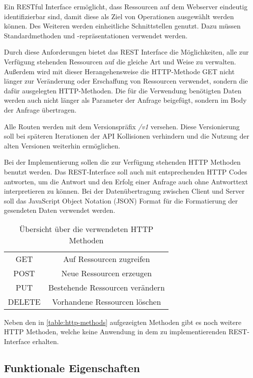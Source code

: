 Ein RESTful Interface ermöglicht, dass Ressourcen auf dem Webserver eindeutig identifizierbar sind, damit diese als Ziel von Operationen ausgewählt werden können. Des Weiteren werden einheitliche Schnittstellen genutzt. Dazu müssen Standardmethoden und -repräsentationen verwendet werden.

Durch diese Anforderungen bietet das REST Interface die Möglichkeiten, alle zur Verfügung stehenden Ressourcen auf die gleiche Art und Weise zu verwalten. Außerdem wird mit dieser Herangehensweise die HTTP-Methode GET nicht länger zur Veränderung oder Erschaffung von Ressourcen verwendet, sondern die dafür ausgelegten HTTP-Methoden. Die für die Verwendung benötigten Daten werden auch nicht länger als Parameter der Anfrage beigefügt, sondern im Body der Anfrage übertragen. \cite{beimsWebApplikationenREST2014}

Alle Routen werden mit dem Versionspräfix \textit{/v1} versehen. Diese Versionierung soll bei späteren Iterationen der API Kollisionen verhindern und die Nutzung der alten Versionen weiterhin ermöglichen. 

Bei der Implementierung sollen die zur Verfügung stehenden HTTP Methoden benutzt werden. Das REST-Interface soll auch mit entsprechenden HTTP Codes antworten, um die Antwort und den Erfolg einer Anfrage auch ohne Antworttext interpretieren zu können. Bei der Datenübertragung zwischen Client und Server soll das JavaScript Object Notation (JSON) Format für die Formatierung der gesendeten Daten verwendet werden.

\begin{table}
	\centering
	\begin{tabular}{c c}
		GET & Auf Ressourcen zugreifen \\ 
		POST & Neue Ressourcen erzeugen \\  
		PUT & Bestehende Ressourcen verändern \\
		DELETE & Vorhandene Ressourcen löschen \\
	\end{tabular}
	\caption{Übersicht über die verwendeten HTTP Methoden}
	\label{table:http-methods}
\end{table}

Neben den in \autoref{table:http-methods} aufgezeigten Methoden gibt es noch weitere HTTP Methoden, welche keine Anwendung in dem zu implementierenden REST-Interface erhalten.

\subsection{Funktionale Eigenschaften}
